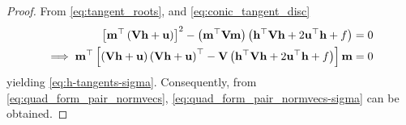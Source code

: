\begin{proof}
 From \eqref{eq:tangent_roots},
 and
  \eqref{eq:conic_tangent_disc}
  \begin{align}
  {}\left[
  \mathbf{m}^{\top}\left(\mathbf{V}\mathbf{h}+\mathbf{u}\right)
  \right]^2 -\left(\mathbf{m}^{\top}\mathbf{V}\mathbf{m}\right)
  \left(
  \mathbf{h}^{\top}\mathbf{V}\mathbf{h} + 2\mathbf{u}^{\top}\mathbf{h} +f
  \right) &= 0                                                                                             
  \\
	  \implies 
  \mathbf{m}^{\top}  {}\left[\left(\mathbf{V}\mathbf{h}+\mathbf{u}\right)
	  \left(\mathbf{V}\mathbf{h}+\mathbf{u}\right)^{\top}
   -\mathbf{V}
  \left(
  \mathbf{h}^{\top}\mathbf{V}\mathbf{h} + 2\mathbf{u}^{\top}\mathbf{h} +f
  \right)\right]\mathbf{m} &= 0                                                                                             
  \label{eq:conic_tangent_disc-h}
  \end{align}                    
  yielding
	  \eqref{eq:h-tangents-sigma}.  Consequently, from 
  \eqref{eq:quad_form_pair_normvecs}, 
  \eqref{eq:quad_form_pair_normvecs-sigma}
  can be obtained.

\end{proof}
